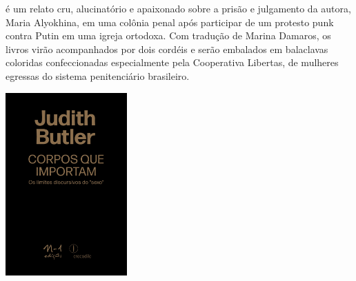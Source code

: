 \hspace*{-7cm}\hrulefill\hspace*{-7cm}

\medskip

 é um relato cru, alucinatório e apaixonado sobre a prisão e julgamento da autora, Maria Alyokhina, em uma colônia penal após participar de um protesto punk contra Putin em uma igreja ortodoxa. Com tradução de Marina Damaros, os livros virão acompanhados por dois cordéis e serão embalados em balaclavas coloridas confeccionadas especialmente pela Cooperativa Libertas, de mulheres egressas do sistema penitenciário brasileiro.

\vfill

\hspace*{-.4cm}\begin{minipage}[c]{1\linewidth}
\small{
{}}
\end{minipage}

\pagebreak

\hspace{.5cm}

\begin{center}
\hspace*{-.5cm}\includegraphics[width=46.6mm]{./imgs/butler.jpg}
\end{center}

\hspace*{-7cm}\hrulefill\hspace*{-7cm}

